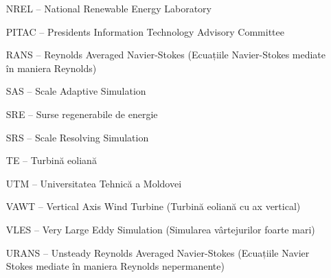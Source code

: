 \begin{itemize}[leftmargin=2cm, topsep=0pt, partopsep=5pt,itemsep=0pt,parsep=0pt]
\item[NREL --] National Renewable Energy Laboratory 
\item[PITAC --] Presidents Information Technology Advisory Committee 
\item[RANS --] Reynolds Averaged Navier-Stokes  (Ecuațiile Navier-Stokes mediate în maniera Reynolds) 
\item[SAS --] Scale Adaptive Simulation 
\item[SRE --] Surse regenerabile de energie 
\item[SRS --] Scale Resolving Simulation 
\item[TE --] Turbină eoliană 
\item[UTM --] Universitatea Tehnică a Moldovei 
\item[VAWT --] Vertical Axis Wind Turbine (Turbină eoliană cu ax vertical) 
\item[VLES --] Very Large Eddy Simulation (Simularea vârtejurilor foarte mari)
\item[URANS --] Unsteady Reynolds Averaged Navier-Stokes (Ecuațiile Navier Stokes mediate în maniera Reynolds nepermanente)
\end{itemize}